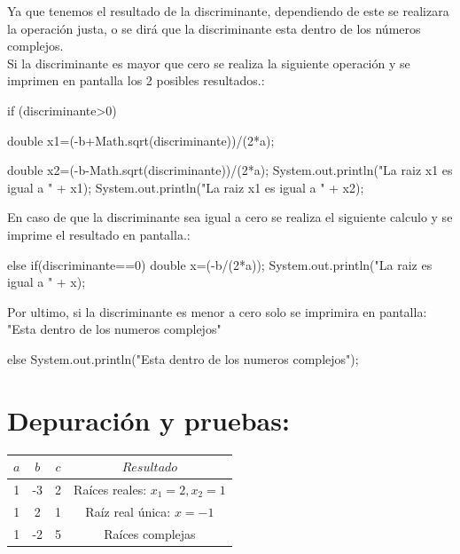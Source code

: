 \documentclass{IEEEcsmag}
\begin{document}
Ya que tenemos el resultado de la discriminante, dependiendo de este se realizara la operación justa, o se dirá que la discriminante esta dentro de los números complejos.\\
Si la discriminante es mayor que cero se realiza la siguiente operación y se imprimen en pantalla los 2 posibles resultados.:
\begin{javaCode}
    if (discriminante>0) {
            double x1=(-b+Math.sqrt(discriminante))/(2*a);
            
            double x2=(-b-Math.sqrt(discriminante))/(2*a);
            System.out.println("La raiz x1 es igual a " + x1);
            System.out.println("La raiz x1 es igual a " + x2);
            
        }
\end{javaCode}
En caso de que la discriminante sea igual a cero se realiza el siguiente calculo y se imprime el resultado en pantalla.:
\begin{javaCode}
    else if(discriminante==0){
            double x=(-b/(2*a));
            System.out.println("La raiz es igual a " + x);
        }
\end{javaCode}
Por ultimo, si la discriminante es menor a cero solo se imprimira en pantalla:\\"Esta dentro de los numeros complejos"
\begin{javaCode}
    else{
            System.out.println("Esta dentro de los numeros complejos");
        }
\end{javaCode}

\section*{Depuración y pruebas:}
\begin{center}
\begin{tabular}{|c|c|c|c|}
\hline
\textbf{\(a\)} & \textbf{\(b\)} & \textbf{\(c\)} & \textbf{\(Resultado\)} \\
\hline
1 & -3 & 2 & Raíces reales: \(x_1 = 2, x_2 = 1\) \\
\hline
1 & 2 & 1 & Raíz real única: \(x = -1\) \\
\hline
1 & -2 & 5 & Raíces complejas \\
\hline
\end{tabular}
\end{center}

\clearpage
\end{document}
